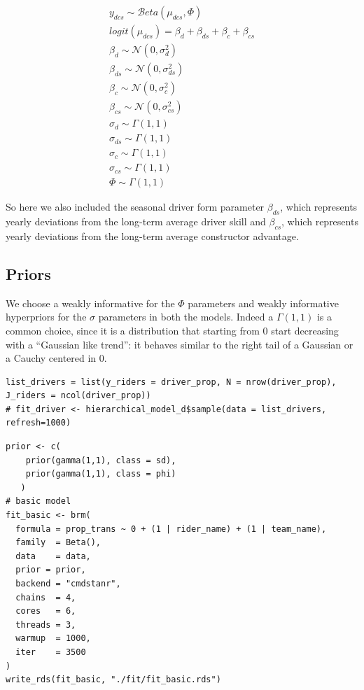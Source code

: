 \documentclass[
]{article}
\begin{document}
\[\begin{align*} y_{dcs} \sim {\mathcal Beta}(\mu_{dcs},\Phi) \\ logit(\mu_{dcs}) = \beta_{d} + \beta_{ds} + \beta_{c} + \beta_{cs} \\ \beta_{d} \sim {\mathcal N}(0,\sigma^{2}_{d}) \\ \beta_{ds} \sim {\mathcal N}(0,\sigma^{2}_{ds}) \\ \beta_{c} \sim {\mathcal N}(0,\sigma^{2}_{c}) \\ \beta_{cs} \sim {\mathcal N}(0,\sigma^{2}_{cs}) \\ \sigma_{d} \sim {\mathcal \Gamma}(1,1) \\ \sigma_{ds} \sim {\mathcal \Gamma}(1,1) \\ \sigma_{c} \sim {\mathcal \Gamma}(1,1) \\ \sigma_{cs} \sim {\mathcal \Gamma}(1,1) \\ \Phi \sim \Gamma(1,1) \end{align*}\]

So here we also included the seasonal driver form parameter
\(\beta_{ds}\), which represents yearly deviations from the long-term
average driver skill and \(\beta_{cs}\), which represents yearly
deviations from the long-term average constructor advantage.

\hypertarget{priors}{%
\subsection{Priors}\label{priors}}

We choose a weakly informative for the \(\Phi\) parameters and weakly
informative hyperpriors for the \(\sigma\) parameters in both the
models. Indeed a \(\Gamma(1,1)\) is a common choice, since it is a
distribution that starting from 0 start decreasing with a ``Gaussian
like trend'': it behaves similar to the right tail of a Gaussian or a
Cauchy centered in 0.

\begin{verbatim}
list_drivers = list(y_riders = driver_prop, N = nrow(driver_prop), J_riders = ncol(driver_prop))
# fit_driver <- hierarchical_model_d$sample(data = list_drivers, refresh=1000)
\end{verbatim}

\begin{verbatim}
prior <- c(
    prior(gamma(1,1), class = sd),
    prior(gamma(1,1), class = phi)
   )
# basic model
fit_basic <- brm(
  formula = prop_trans ~ 0 + (1 | rider_name) + (1 | team_name),
  family  = Beta(),
  data    = data,
  prior = prior,
  backend = "cmdstanr",
  chains  = 4,
  cores   = 6,
  threads = 3,
  warmup  = 1000,
  iter    = 3500
)
write_rds(fit_basic, "./fit/fit_basic.rds")
\end{verbatim}
\end{document}
